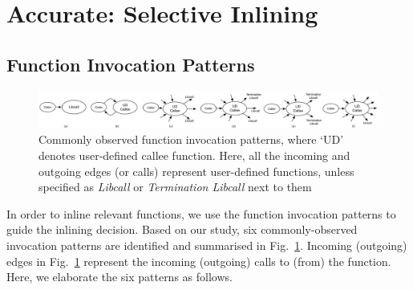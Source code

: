 \section{Accurate: Selective Inlining}\label{sec:inline}

\subsection{Function Invocation Patterns}
\begin{figure}[t]
   \centering
  \includegraphics[width=\textwidth]{srj-figures/srj-caller-callee6.pdf}
  \caption{Commonly observed function invocation patterns, where `UD' denotes user-defined callee function. Here, all the incoming and outgoing edges (or calls) represent user-defined functions, unless specified as \textit{Libcall} or \textit{Termination Libcall} next to them} \label{fig:caller-callee} \vspace{-1mm}
\end{figure}
In order to inline relevant functions, we use the function invocation patterns to guide the inlining decision. Based on our study, six commonly-observed invocation patterns are identified and summarised in Fig.~\ref{fig:caller-callee}.
Incoming (outgoing) edges in Fig.~\ref{fig:caller-callee} represent the incoming (outgoing) calls to (from) the function.
Here, we elaborate the six patterns as follows.


